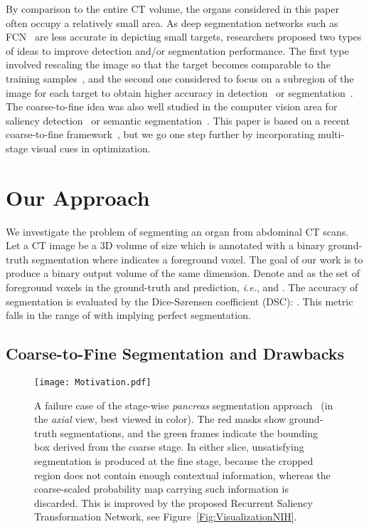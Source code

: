 \documentclass[10pt,twocolumn,letterpaper]{article}
\begin{document}
By comparison to the entire CT volume, the organs considered in this paper often occupy a relatively small area.
As deep segmentation networks such as FCN~\cite{Long_2015_Fully} are less accurate in depicting small targets,
researchers proposed two types of ideas to improve detection and/or segmentation performance.
The first type involved rescaling the image so that the target becomes comparable to the training samples~\cite{Xia_2016_Zoom},
and the second one considered to focus on a subregion of the image for each target
to obtain higher accuracy in detection~\cite{Chen_2016_Mitosis} or segmentation~\cite{Zhou_2017_Fixed}.
The coarse-to-fine idea was also well studied in the computer vision area
for saliency detection~\cite{Kuen_2016_Recurrent} or semantic segmentation~\cite{Li_2017_Instance}\cite{Lin_2017_RefineNet}.
This paper is based on a recent coarse-to-fine framework~\cite{Zhou_2017_Fixed},
but we go one step further by incorporating multi-stage visual cues in optimization.


\vspace{-0.02cm}
\section{Our Approach}
\label{Approach}

We investigate the problem of segmenting an organ from abdominal CT scans.
Let a CT image be a 3D volume  of size 
which is annotated with a binary ground-truth segmentation  where  indicates a foreground voxel.
The goal of our work is to produce a binary output volume  of the same dimension.
Denote  and  as the set of foreground voxels in the ground-truth and prediction,
{\em i.e.},  and .
The accuracy of segmentation is evaluated by the Dice-S{\o}rensen coefficient (DSC):
.
This metric falls in the range of  with  implying perfect segmentation.


\subsection{Coarse-to-Fine Segmentation and Drawbacks}
\label{Approach:Baseline}

\renewcommand{\figurewidth}{8.0cm}
\begin{figure}[t]
\begin{center}
    \texttt{[image: Motivation.pdf]}
\end{center}
\caption{
    A failure case of the stage-wise {\em pancreas} segmentation approach~\cite{Zhou_2017_Fixed}
    (in the {\em axial} view, best viewed in color).
    The red masks show ground-truth segmentations,
    and the green frames indicate the bounding box derived from the coarse stage.
    In either slice, unsatisfying segmentation is produced at the fine stage,
    because the cropped region does not contain enough contextual information,
    whereas the coarse-scaled probability map carrying such information is discarded.
    This is improved by the proposed Recurrent Saliency Transformation Network, see Figure~\ref{Fig:VisualizationNIH}.
}
\label{Fig:Motivation}
\end{figure}
\end{document}
